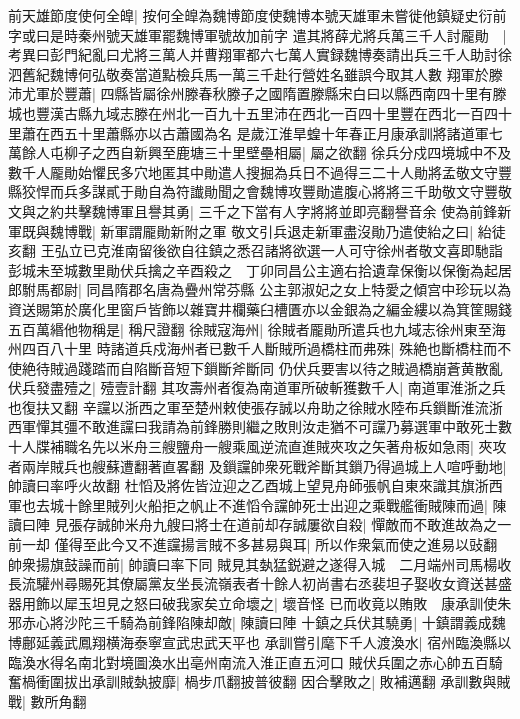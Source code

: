 前天雄節度使何全皥|{
	按何全皥為魏博節度使魏博本號天雄軍未嘗徙他鎮疑史衍前字或曰是時秦州號天雄軍罷魏博軍號故加前字}
遣其將薛尤將兵萬三千人討龎勛　|{
	考異曰彭門紀亂曰尤將三萬人并曹翔軍都六七萬人實録魏博奏請出兵三千人助討徐泗舊紀魏博何弘敬奏當道點檢兵馬一萬三千赴行營姓名雖誤今取其人數}
翔軍於滕沛尤軍於豐蕭|{
	四縣皆屬徐州滕春秋滕子之國隋置滕縣宋白曰以縣西南四十里有滕城也豐漢古縣九域志滕在州北一百九十五里沛在西北一百四十里豐在西北一百四十里蕭在西五十里蕭縣亦以古蕭國為名}
是歲江淮旱蝗十年春正月康承訓將諸道軍七萬餘人屯柳子之西自新興至鹿塘三十里壁壘相屬|{
	屬之欲翻}
徐兵分戍四境城中不及數千人龎勛始懼民多穴地匿其中勛遣人搜掘為兵日不過得三二十人勛將孟敬文守豐縣狡悍而兵多謀貳于勛自為符䜟勛聞之會魏博攻豐勛遣腹心將將三千助敬文守豐敬文與之約共擊魏博軍且譽其勇|{
	三千之下當有人字將將並即亮翻譽音余}
使為前鋒新軍既與魏博戰|{
	新軍謂龎勛新附之軍}
敬文引兵退走新軍盡沒勛乃遣使紿之曰|{
	紿徒亥翻}
王弘立已克淮南留後欲自往鎮之悉召諸將欲選一人可守徐州者敬文喜即馳詣彭城未至城數里勛伏兵擒之辛酉殺之　丁卯同昌公主適右拾遺韋保衡以保衡為起居郎駙馬都尉|{
	同昌隋郡名唐為疊州常芬縣}
公主郭淑妃之女上特愛之傾宫中珍玩以為資送賜第於廣化里窗戶皆飾以雜寶井欄藥臼槽匱亦以金銀為之編金縷以為箕筐賜錢五百萬緡他物稱是|{
	稱尺證翻}
徐賊寇海州|{
	徐賊者龎勛所遣兵也九域志徐州東至海州四百八十里}
時諸道兵戍海州者已數千人斷賊所過橋柱而弗殊|{
	殊絶也斷橋柱而不使絶待賊過踐踏而自陷斷音短下鎻斷斧斷同}
仍伏兵要害以待之賊過橋崩蒼黄散亂伏兵發盡殪之|{
	殪壹計翻}
其攻壽州者復為南道軍所破斬獲數千人|{
	南道軍淮浙之兵也復扶又翻}
辛讜以浙西之軍至楚州敕使張存誠以舟助之徐賊水陸布兵鎻斷淮流浙西軍憚其彊不敢進讜曰我請為前鋒勝則繼之敗則汝走猶不可讜乃募選軍中敢死士數十人牒補職名先以米舟三艘鹽舟一艘乘風逆流直進賊夾攻之矢著舟板如急雨|{
	夾攻者兩岸賊兵也艘蘇遭翻著直畧翻}
及鎻讜帥衆死戰斧斷其鎻乃得過城上人喧呼動地|{
	帥讀曰率呼火故翻}
杜慆及將佐皆泣迎之乙酉城上望見舟師張帆自東來識其旗浙西軍也去城十餘里賊列火船拒之帆止不進慆令讜帥死士出迎之乘戰艦衝賊陳而過|{
	陳讀曰陣}
見張存誠帥米舟九艘曰將士在道前却存誠屢欲自殺|{
	憚敵而不敢進故為之一前一却}
僅得至此今又不進讜揚言賊不多甚易與耳|{
	所以作衆氣而使之進易以䜴翻}
帥衆揚旗鼓譟而前|{
	帥讀曰率下同}
賊見其埶猛鋭避之遂得入城　二月端州司馬楊收長流驩州尋賜死其僚屬黨友坐長流嶺表者十餘人初尚書右丞裴坦子娶收女資送甚盛器用飾以犀玉坦見之怒曰破我家矣立命壞之|{
	壞音怪}
已而收竟以賄敗　康承訓使朱邪赤心將沙陀三千騎為前鋒陷陳却敵|{
	陳讀曰陣}
十鎮之兵伏其驍勇|{
	十鎮謂義成魏博鄜延義武鳳翔横海泰寧宣武忠武天平也}
承訓嘗引麾下千人渡渙水|{
	宿州臨渙縣以臨渙水得名南北對境圖渙水出亳州南流入淮正直五河口}
賊伏兵圍之赤心帥五百騎奮楇衝圍拔出承訓賊埶披靡|{
	楇步爪翻披普彼翻}
因合擊敗之|{
	敗補邁翻}
承訓數與賊戰|{
	數所角翻}
